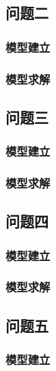 \documentclass{../../../Template/cumcmthesis-2025} %
\begin{document}
\subsection{问题二}

\subsubsection{模型建立}



\subsubsection{模型求解}



\subsection{问题三}

\subsubsection{模型建立}



\subsubsection{模型求解}


\subsection{问题四}

\subsubsection{模型建立}



\subsubsection{模型求解}


\subsection{问题五}

\subsubsection{模型建立}
\end{document}
